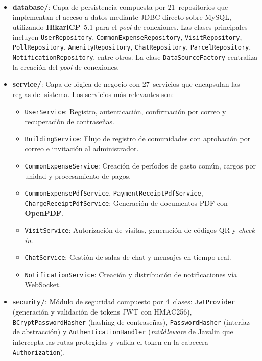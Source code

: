 \begin{itemize}
    \item \textbf{database/}: Capa de persistencia compuesta por 21~repositorios que implementan el acceso a datos mediante JDBC directo sobre MySQL, utilizando \textbf{HikariCP}~5.1 para el \textit{pool} de conexiones. Las clases principales incluyen \texttt{UserRepository}, \texttt{CommonExpenseRepository}, \texttt{VisitRepository}, \texttt{PollRepository}, \texttt{AmenityRepository}, \texttt{ChatRepository}, \texttt{ParcelRepository}, \texttt{NotificationRepository}, entre otros. La clase \texttt{DataSourceFactory} centraliza la creación del \textit{pool} de conexiones.

    \item \textbf{service/}: Capa de lógica de negocio con 27~servicios que encapsulan las reglas del sistema. Los servicios más relevantes son:
    \begin{itemize}
        \item \texttt{UserService}: Registro, autenticación, confirmación por correo y recuperación de contraseñas.
        \item \texttt{BuildingService}: Flujo de registro de comunidades con aprobación por correo e invitación al administrador.
        \item \texttt{CommonExpenseService}: Creación de períodos de gasto común, cargos por unidad y procesamiento de pagos.
        \item \texttt{CommonExpensePdfService}, \texttt{PaymentReceiptPdfService}, \texttt{ChargeReceiptPdfService}: Generación de documentos PDF con \textbf{OpenPDF}.
        \item \texttt{VisitService}: Autorización de visitas, generación de códigos QR y \textit{check-in}.
        \item \texttt{ChatService}: Gestión de salas de chat y mensajes en tiempo real.
        \item \texttt{NotificationService}: Creación y distribución de notificaciones vía WebSocket.
    \end{itemize}

    \item \textbf{security/}: Módulo de seguridad compuesto por 4~clases: \texttt{JwtProvider} (generación y validación de tokens JWT con HMAC256), \texttt{BCryptPasswordHasher} (hashing de contraseñas), \texttt{PasswordHasher} (interfaz de abstracción) y \texttt{AuthenticationHandler} (\textit{middleware} de Javalin que intercepta las rutas protegidas y valida el token en la cabecera \texttt{Authorization}).


\end{itemize}
